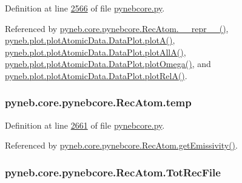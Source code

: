 Definition at line \hyperlink{pynebcore_8py_source_l02566}{2566} of file \hyperlink{pynebcore_8py_source}{pynebcore.\+py}.



Referenced by \hyperlink{pynebcore_8py_source_l03032}{pyneb.\+core.\+pynebcore.\+Rec\+Atom.\+\_\+\+\_\+repr\+\_\+\+\_\+()}, \hyperlink{plot_atomic_data_8py_source_l00116}{pyneb.\+plot.\+plot\+Atomic\+Data.\+Data\+Plot.\+plot\+A()}, \hyperlink{plot_atomic_data_8py_source_l00188}{pyneb.\+plot.\+plot\+Atomic\+Data.\+Data\+Plot.\+plot\+All\+A()}, \hyperlink{plot_atomic_data_8py_source_l00372}{pyneb.\+plot.\+plot\+Atomic\+Data.\+Data\+Plot.\+plot\+Omega()}, and \hyperlink{plot_atomic_data_8py_source_l00261}{pyneb.\+plot.\+plot\+Atomic\+Data.\+Data\+Plot.\+plot\+Rel\+A()}.

\hypertarget{classpyneb_1_1core_1_1pynebcore_1_1_rec_atom_afdcfb955b81391dabcb298fe4990e33c}{}
\subsubsection[{temp}]{\setlength{\rightskip}{0pt plus 5cm}pyneb.\+core.\+pynebcore.\+Rec\+Atom.\+temp}\label{classpyneb_1_1core_1_1pynebcore_1_1_rec_atom_afdcfb955b81391dabcb298fe4990e33c}


Definition at line \hyperlink{pynebcore_8py_source_l02661}{2661} of file \hyperlink{pynebcore_8py_source}{pynebcore.\+py}.



Referenced by \hyperlink{pynebcore_8py_source_l02873}{pyneb.\+core.\+pynebcore.\+Rec\+Atom.\+get\+Emissivity()}.

\hypertarget{classpyneb_1_1core_1_1pynebcore_1_1_rec_atom_a3654e24299df680fe969486399e27880}{}
\subsubsection[{Tot\+Rec\+File}]{\setlength{\rightskip}{0pt plus 5cm}pyneb.\+core.\+pynebcore.\+Rec\+Atom.\+Tot\+Rec\+File}\label{classpyneb_1_1core_1_1pynebcore_1_1_rec_atom_a3654e24299df680fe969486399e27880}


